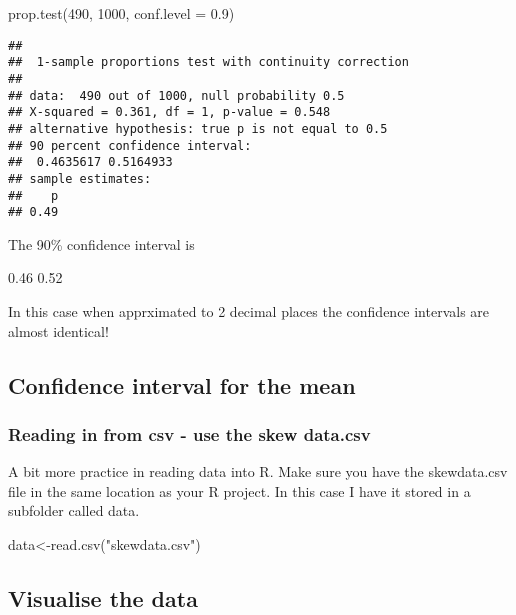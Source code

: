 \documentclass[
]{article}
\newenvironment{Shaded}{\begin{snugshade}}{\end{snugshade}}
\newcommand{\AttributeTok}[1]{\textcolor[rgb]{0.77,0.63,0.00}{#1}}
\newcommand{\DecValTok}[1]{\textcolor[rgb]{0.00,0.00,0.81}{#1}}
\newcommand{\FloatTok}[1]{\textcolor[rgb]{0.00,0.00,0.81}{#1}}
\newcommand{\FunctionTok}[1]{\textcolor[rgb]{0.00,0.00,0.00}{#1}}
\newcommand{\NormalTok}[1]{#1}
\newcommand{\OtherTok}[1]{\textcolor[rgb]{0.56,0.35,0.01}{#1}}
\newcommand{\StringTok}[1]{\textcolor[rgb]{0.31,0.60,0.02}{#1}}
\begin{document}
\begin{Shaded}
\begin{Highlighting}[]
\FunctionTok{prop.test}\NormalTok{(}\DecValTok{490}\NormalTok{, }\DecValTok{1000}\NormalTok{, }\AttributeTok{conf.level =} \FloatTok{0.9}\NormalTok{)}
\end{Highlighting}
\end{Shaded}

\begin{verbatim}
## 
##  1-sample proportions test with continuity correction
## 
## data:  490 out of 1000, null probability 0.5
## X-squared = 0.361, df = 1, p-value = 0.548
## alternative hypothesis: true p is not equal to 0.5
## 90 percent confidence interval:
##  0.4635617 0.5164933
## sample estimates:
##    p 
## 0.49
\end{verbatim}

The 90\% confidence interval is

0.46 0.52

In this case when apprximated to 2 decimal places the confidence
intervals are almost identical!

\hypertarget{confidence-interval-for-the-mean}{%
\subsection{Confidence interval for the
mean}\label{confidence-interval-for-the-mean}}

\hypertarget{reading-in-from-csv---use-the-skew-data.csv}{%
\subsubsection{Reading in from csv - use the skew
data.csv}\label{reading-in-from-csv---use-the-skew-data.csv}}

A bit more practice in reading data into R. Make sure you have the
skewdata.csv file in the same location as your R project. In this case I
have it stored in a subfolder called data.

\begin{Shaded}
\begin{Highlighting}[]
\NormalTok{data}\OtherTok{\textless{}{-}}\FunctionTok{read.csv}\NormalTok{(}\StringTok{"skewdata.csv"}\NormalTok{)}
\end{Highlighting}
\end{Shaded}

\hypertarget{visualise-the-data}{%
\subsection{Visualise the data}\label{visualise-the-data}}
\end{document}
